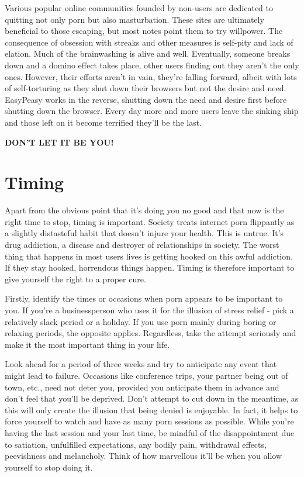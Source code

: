 \documentclass[
]{book}
\begin{document}
Various popular online communities founded by non-users are dedicated to quitting not only porn but also masturbation. These sites are ultimately beneficial to those escaping, but most notes point them to try willpower. The consequence of obsession with streaks and other measures is self-pity and lack of elation. Much of the brainwashing is alive and well. Eventually, someone breaks down and a domino effect takes place, other users finding out they aren't the only ones. However, their efforts aren't in vain, they're falling forward, albeit with lots of self-torturing as they shut down their browsers but not the desire and need. EasyPeasy works in the reverse, shutting down the need and desire first before shutting down the browser. Every day more and more users leave the sinking ship and those left on it become terrified they'll be the last.

\textbf{DON'T LET IT BE YOU!}

\hypertarget{timing}{%
\chapter{Timing}\label{timing}}

Apart from the obvious point that it's doing you no good and that now is the right time to stop, timing is important. Society treats internet porn flippantly as a slightly distasteful habit that doesn't injure your health. This is untrue. It's drug addiction, a disease and destroyer of relationships in society. The worst thing that happens in most users lives is getting hooked on this awful addiction. If they stay hooked, horrendous things happen. Timing is therefore important to give yourself the right to a proper cure.

Firstly, identify the times or occasions when porn appears to be important to you. If you're a businessperson who uses it for the illusion of stress relief - pick a relatively slack period or a holiday. If you use porn mainly during boring or relaxing periods, the opposite applies. Regardless, take the attempt seriously and make it the most important thing in your life.

Look ahead for a period of three weeks and try to anticipate any event that might lead to failure. Occasions like conference trips, your partner being out of town, etc., need not deter you, provided you anticipate them in advance and don't feel that you'll be deprived. Don't attempt to cut down in the meantime, as this will only create the illusion that being denied is enjoyable. In fact, it helps to force yourself to watch and have as many porn sessions as possible. While you're having the last session and your last time, be mindful of the disappointment due to satiation, unfulfilled expectations, any bodily pain, withdrawal effects, peevishness and melancholy. Think of how marvellous it'll be when you allow yourself to stop doing it.
\end{document}
